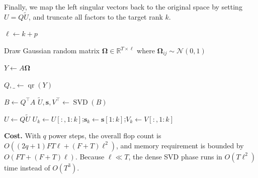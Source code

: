 \documentclass[11pt,a4paper]{article}
\theoremstyle{plain}
\theoremstyle{definition}
\theoremstyle{remark}
\begin{document}
Finally, we map the left singular vectors back to the original
space by setting $U = Q \tilde{U}$, and truncate all factors to the target rank $k$.

\begin{algorithm}[ht]
  \caption{Randomized SVD with Power Step}\label{alg:rsvd}



  $\ell \gets k + p$

  Draw Gaussian random matrix $\mathbf{\Omega} \in \mathbb{R}^{T \times \ell}$ where $\mathbf{\Omega}_{ij} \sim \mathcal{N}(0, 1)$\;

  $Y \gets A \mathbf{\Omega}$

  $Q, \_ \gets \operatorname{qr}(Y)$

  \medskip
  $B \gets Q^\top A$
  $\tilde{U}, \mathbf{s}, V^\top \gets \operatorname{SVD}(B)$

  \medskip
  $U \gets Q \tilde{U}$\;
  $U_k \gets U[:, 1:k]$;\quad $\mathbf{s}_k \gets \mathbf{s}[1:k]$;\quad $V_k \gets V[:, 1:k]$\;
\end{algorithm}

\medskip\noindent\textbf{Cost.}
With $q$ power steps, the overall flop count is $O((2q+1)FT\ell + (F+T)\ell^2)$,
and memory requirement is bounded by $O(FT + (F+T)\ell)$. Because $\ell \ll T$,
the dense SVD phase runs in $O(T\ell^2)$ time instead of $O(T^3)$.
\end{document}
